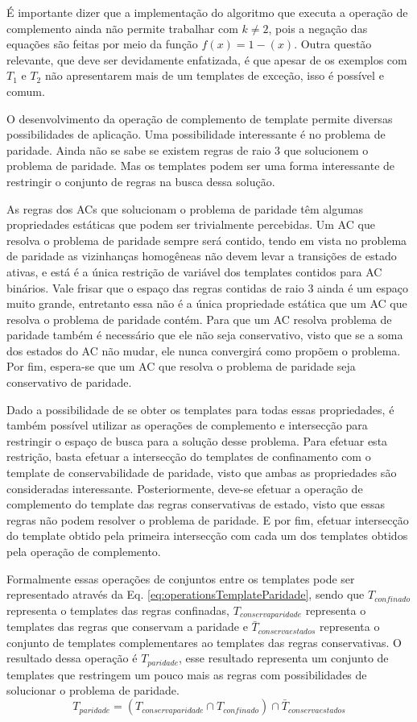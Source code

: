 É importante dizer que a implementação do algoritmo que executa a operação de complemento ainda não permite trabalhar com $k\neq 2$, pois a negação das equações são feitas por meio da função $f(x) = 1 - (x)$. Outra questão relevante, que deve ser devidamente enfatizada, é que apesar de os exemplos com $T_1$ e $T_2$ não apresentarem mais de um templates de exceção, isso é possível e comum.

O desenvolvimento da operação de complemento de template permite diversas possibilidades de aplicação. 
Uma possibilidade interessante é no problema de paridade. 
Ainda não se sabe se existem regras de raio 3 que solucionem o problema de paridade. 
Mas os templates podem ser uma forma interessante de restringir o conjunto de regras na busca dessa solução.

As regras dos ACs que solucionam o problema de paridade têm algumas propriedades estáticas que podem ser trivialmente percebidas. 
Um AC que resolva o problema de paridade sempre será contido, tendo em vista no problema de paridade as vizinhanças homogêneas não devem levar a transições de estado ativas, e está é a única restrição de variável dos templates contidos para AC binários. 
Vale frisar que o espaço das regras contidas de raio 3 ainda é um espaço muito grande, entretanto essa não é a única propriedade estática que um AC que resolva o problema de paridade contém. 
Para que um AC resolva problema de paridade também é necessário que ele não seja conservativo, visto que se a soma dos estados do AC não mudar, ele nunca convergirá como propõem o problema. 
Por fim, espera-se que um AC que resolva o problema de paridade seja conservativo de paridade.

Dado a possibilidade de se obter os templates para todas essas propriedades, é também possível utilizar as operações de complemento e intersecção para restringir o espaço de busca para a solução desse problema.
Para efetuar esta restrição, basta efetuar a intersecção do templates de confinamento com o template de conservabilidade de paridade, visto que ambas as propriedades são consideradas interessante. 
Posteriormente, deve-se efetuar a operação de complemento do template das regras conservativas de estado, visto que essas regras não podem resolver o problema de paridade. 
E por fim, efetuar intersecção do template obtido pela primeira intersecção com cada um dos templates obtidos pela operação de complemento.

Formalmente essas operações de conjuntos entre os templates pode ser representado através da Eq. \eqref{eq:operationsTemplateParidade}, sendo que $T_{confinado}$ representa o templates das regras confinadas, $T_{conservaparidade}$ representa o templates das regras que conservam a paridade e $\bar{T}_{conservaestados}$ representa o conjunto de templates complementares ao templates das regras conservativas. O resultado dessa operação é $T_{paridade}$, esse resultado representa um conjunto de templates que restringem um pouco mais as regras com possibilidades de solucionar o problema de paridade.
\begin{equation}
T_{paridade} = (T_{conservaparidade} \cap T_{confinado}) \cap \bar{T}_{conservaestados}
\label{eq:operationsTemplateParidade}
\end{equation}